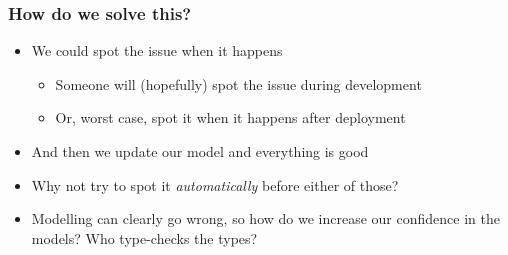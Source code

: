 \documentclass[compress,handout]{beamer}
\begin{document}
\begin{frame}
  \frametitle{How do we solve this?}

  \begin{itemize}
    \item<1-> We could spot the issue when it happens
    \begin{itemize}
      \item<2-> Someone will (hopefully) spot the issue during development
      \item<3-> Or, worst case, spot it when it happens after deployment
    \end{itemize}
    \item<4-> And then we update our model and everything is good
    \item<5-> Why not try to spot it \textit{automatically} before either of
              those?
    \item<6-> Modelling can clearly go wrong, so how do we increase our
              confidence in the models? Who type-checks the types?
  \end{itemize}
\end{frame}


\end{document}
